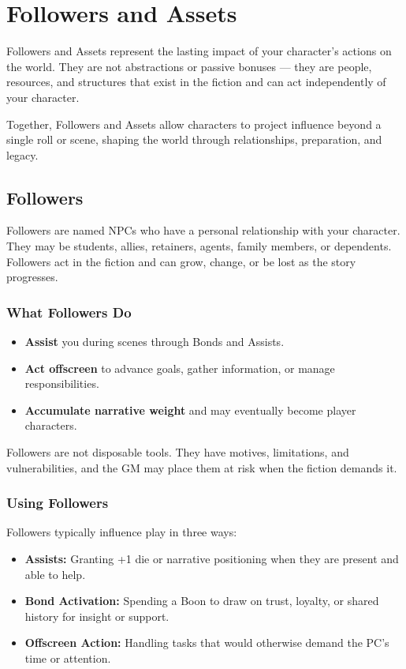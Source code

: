 
\section{Followers and Assets}

Followers and Assets represent the lasting impact of your character's actions on the world. They are not abstractions or passive bonuses --- they are people, resources, and structures that exist in the fiction and can act independently of your character.

Together, Followers and Assets allow characters to project influence beyond a single roll or scene, shaping the world through relationships, preparation, and legacy.

\subsection{Followers}

Followers are named NPCs who have a personal relationship with your character. They may be students, allies, retainers, agents, family members, or dependents. Followers act in the fiction and can grow, change, or be lost as the story progresses.

\subsubsection{What Followers Do}
\begin{itemize}
  \item \textbf{Assist} you during scenes through Bonds and Assists.
  \item \textbf{Act offscreen} to advance goals, gather information, or manage responsibilities.
  \item \textbf{Accumulate narrative weight} and may eventually become player characters.
\end{itemize}

Followers are not disposable tools. They have motives, limitations, and vulnerabilities, and the GM may place them at risk when the fiction demands it.

\subsubsection{Using Followers}
Followers typically influence play in three ways:
\begin{itemize}
  \item \textbf{Assists:} Granting +1 die or narrative positioning when they are present and able to help.
  \item \textbf{Bond Activation:} Spending a Boon to draw on trust, loyalty, or shared history for insight or support.
  \item \textbf{Offscreen Action:} Handling tasks that would otherwise demand the PC's time or attention.
\end{itemize}

